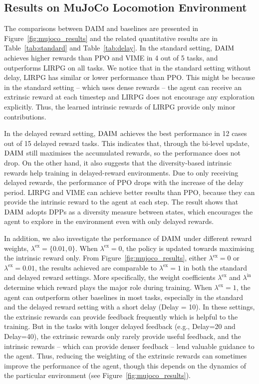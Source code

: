 \subsection{Results on MuJoCo Locomotion Environment}
The comparisons between DAIM and baselines are presented in Figure~\ref{fig:mujoco_results} and the related quantitative results are in Table~\ref{tab:standard} and Table~\ref{tab:delay}. In the standard setting, $\text{DAIM}$ achieves higher rewards than PPO and VIME in 4 out of 5 tasks, and outperforms LIRPG on all tasks. We notice that in the standard setting without delay, LIRPG has similar or lower performance than PPO. This might be because in the standard setting -- which uses dense rewards -- the agent can receive an extrinsic reward at each timestep and LIRPG does not encourage any exploration explicitly. Thus, the learned intrinsic rewards {of LIRPG} provide only minor contributions. 

In the delayed reward setting, $\text{DAIM}$ achieves the best performance in 12 cases out of 15 delayed reward tasks. This indicates that, through the bi-level update, $\text{DAIM}$ still maximises the accumulated rewards, so the performance does not drop. On the other hand, it also suggests that the diversity-based intrinsic rewards help training in delayed-reward environments. Due to only receiving delayed rewards, the performance of PPO drops with the increase of the delay period. LIRPG and VIME can achieve better results than PPO, because they can provide the intrinsic reward to the agent at each step. The result shows that $\text{DAIM}$ adopts DPPs as a diversity measure between states, which encourages the agent to explore in the environment even with only delayed rewards.

In addition, we also investigate the performance of $\text{DAIM}$ under different reward weights, $\lambda^{\text{ex}}=\{0.01, 0\}$. When $\lambda^{\text{ex}}=0$, the policy is updated towards maximising the intrinsic reward only. From Figure~\ref{fig:mujoco_results}, either $\lambda^{\text{ex}}=0$ or $\lambda^{\text{ex}}=0.01$, the results achieved are comparable to $\lambda^{\text{ex}}=1$ in both the standard and delayed reward settings. More specifically, the weight coefficients $\lambda^{\text{ex}}$ and $\lambda^{\text{in}}$ determine which reward plays the major role during training.  When $\lambda^{\text{ex}}=1$, the agent can outperform other baselines in most tasks, especially in the standard and the delayed reward setting with a short delay (Delay = 10). In these settings, the extrinsic rewards can provide feedback frequently which is helpful to the training. But in the tasks with longer delayed feedback ({e.g.}, Delay=20 and Delay=40), the extrinsic rewards only rarely provide useful feedback, and the intrinsic rewards -- which can provide denser feedback -- lend valuable guidance to the agent. Thus, reducing the weighting of the extrinsic rewards can sometimes improve the performance of the agent, though this depends on the dynamics of the particular environment (see Figure~\ref{fig:mujoco_results}).

